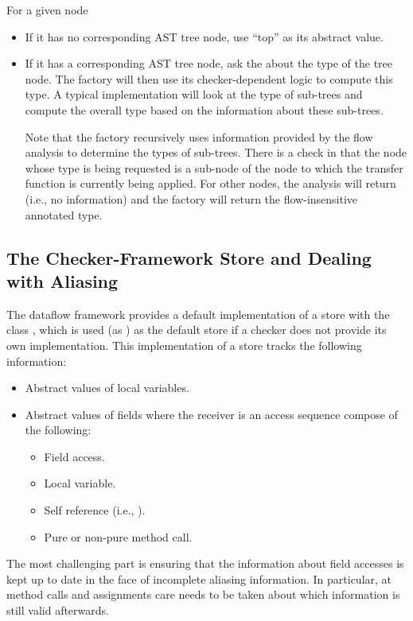 For a given node 
\begin{itemize}
\item
    If it has no corresponding AST tree node, use ``top'' as its abstract value.
\item
    If it has a corresponding AST tree node, ask the  about
    the type of the tree node.  The factory will then use its checker-dependent logic
    to compute this type.  A typical implementation will look at the type
    of sub-trees and compute the overall type based on the information about these sub-trees.
    
    Note that the factory recursively uses information provided by the flow analysis to determine
    the types of sub-trees.  There is a check in  that the node whose type
    is being requested is a sub-node of the node to which the transfer function is currently being
    applied.  For other nodes, the analysis will return  (i.e., no information) and the factory will
    return the flow-insensitive annotated type.

\end{itemize}



\subsection{The Checker-Framework Store and Dealing with Aliasing}

The dataflow framework provides a default implementation of a store with the
class , which is used (as ) as the
default store if a checker does not provide its own implementation.
This implementation of a store tracks the following information:
\begin{itemize}
	\item Abstract values of local variables.
	\item Abstract values of fields where the receiver is an access sequence
	compose of the following:
	\begin{itemize}
	\item Field access.
	\item Local variable.
	\item Self reference (i.e., ).
	\item Pure or non-pure method call.
	\end{itemize}
\end{itemize}

The most challenging part is ensuring that the information about
field accesses is kept up to date in the face of incomplete aliasing
information.  In particular, at method calls and assignments care needs to be
taken about which information is still valid afterwards.

